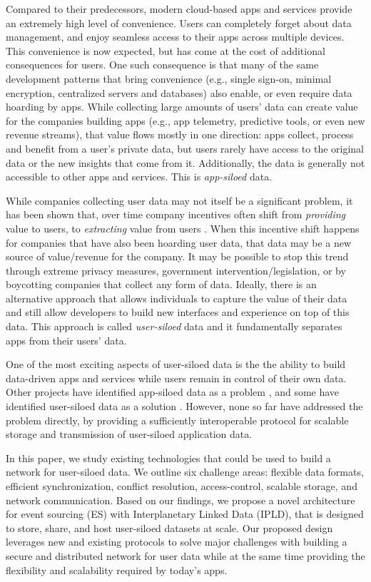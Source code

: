 \documentclass{textile}
\begin{document}
Compared to their predecessors, modern cloud-based apps and services provide an extremely high level of convenience. Users can completely forget about data management, and enjoy seamless access to their apps across multiple devices. This convenience is now expected, but has come at the cost of additional consequences for users. One such consequence is that many of the same development patterns that bring convenience (e.g., single sign-on, minimal encryption, centralized servers and databases) also enable, or even require data hoarding by apps. While collecting large amounts of users' data can create value for the companies building apps (e.g., app telemetry, predictive tools, or even new revenue streams), that value flows mostly in one direction: apps collect, process and benefit from a user's private data, but users rarely have access to the original data or the new insights that come from it. Additionally, the data is generally not accessible to other apps and services. This is \emph{app-siloed} data.

While companies collecting user data may not itself be a significant problem, it has been shown that, over time company incentives often shift from \emph{providing} value to users, to \emph{extracting} value from users \cite{dixonWhyDecentralizationMatters2018}. When this incentive shift happens for companies that have also been hoarding user data, that data may be a new source of value/revenue for the company. It may be possible to stop this trend through extreme privacy measures, government intervention/legislation, or by boycotting companies that collect any form of data. Ideally, there is an alternative approach that allows individuals to capture the value of their data and still allow developers to build new interfaces and experience on top of this data. This approach is called \emph{user-siloed} data and it fundamentally separates apps from their users' data.

One of the most exciting aspects of user-siloed data is the the ability to build data-driven apps and services while users remain in control of their own data. Other projects have identified app-siloed data as a problem \cite{bernersLee_readwrite_2013,de_montjoye_trusted_2012}, and some have identified user-siloed data as a solution \cite{sambraSolidPlatformDecentralized2016}. However, none so far have addressed the problem directly, by providing a sufficiently interoperable protocol for scalable storage and transmission of user-siloed application data.

In this paper, we study existing technologies that could be used to build a network for user-siloed data. We outline six challenge areas: flexible data formats, efficient synchronization, conflict resolution, access-control, scalable storage, and network communication. Based on our findings, we propose a novel architecture for event sourcing (ES) with Interplanetary Linked Data (IPLD), that is designed to store, share, and host user-siloed datasets at scale. Our proposed design leverages new and existing protocols to solve major challenges with building a secure and distributed network for user data while at the same time providing the flexibility and scalability required by today's apps. 
\end{document}

